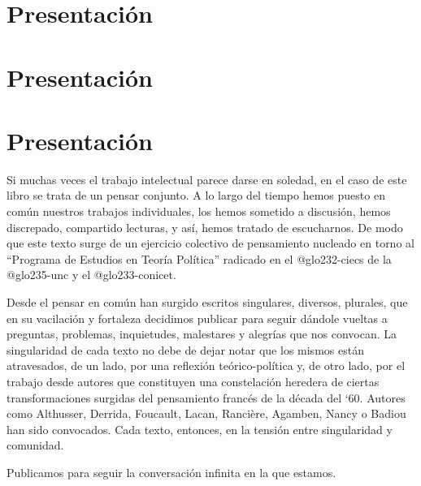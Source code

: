 \ifPDF
\chapter[\hspace{0pc}Presentación]{Presentación} %
\setcounter{PrimPag}{\theCurrentPage}
	\else
	\ifBNPDF
	\chapter[\hspace{0pc}Presentación]{Presentación} %
		\else
		\ifHTMLEPUB
		\chapter{Presentación}
		\fi
	\fi
\fi

Si muchas veces el trabajo intelectual parece darse en soledad, en el caso de este libro se trata de un pensar conjunto. A lo largo del tiempo hemos puesto en común nuestros trabajos individuales, los hemos sometido a discusión, hemos discrepado, compartido lecturas, y así, hemos tratado de escucharnos. De modo que este texto surge de un ejercicio colectivo de pensamiento nucleado en torno al \enquote{Programa de Estudios en Teoría Política} radicado en el \gls{@glo232-ciecs} de la \gls{@glo235-unc} y el \gls{@glo233-conicet}.

Desde el pensar en común han surgido escritos singulares, diversos, plurales, que en su vacilación y fortaleza decidimos publicar para seguir dándole vueltas a preguntas, problemas, inquietudes, malestares y alegrías que nos convocan. La singularidad de cada texto no debe de dejar notar que los mismos están atravesados, de un lado, por una reflexión teórico-política y, de otro lado, por el trabajo desde autores que constituyen una constelación heredera de ciertas transformaciones surgidas del pensamiento francés de la década del `60. Autores como Althusser, Derrida, Foucault, Lacan, Rancière, Agamben, Nancy o Badiou han sido convocados. Cada texto, entonces, en la tensión entre singularidad y comunidad.

Publicamos para seguir la conversación infinita en la que estamos.

\ifPDF
{}
\fi